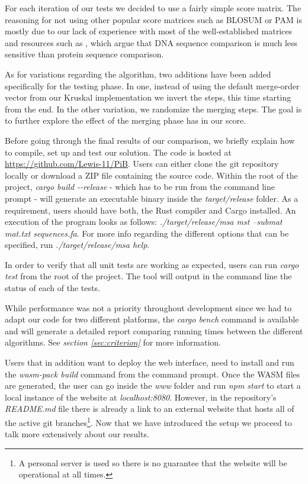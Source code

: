 \documentclass[twoside,openright,titlepage,numbers=noenddot,headinclude,%
                footinclude=true,cleardoublepage=empty,abstractoff, %
                BCOR=5mm,paper=a4,fontsize=11pt,%
                ngerman,american,%
                ]{scrreprt}
\begin{document}
For each iteration of our tests we decided to use a fairly simple score matrix. The reasoning for not using other popular score matrices such as BLOSUM or PAM is mostly due to our lack of experience with most of the well-established matrices and resources such as \cite{pearson2013selecting}, which argue that DNA sequence comparison is much less sensitive than protein sequence comparison.

As for variations regarding the algorithm, two additions have been added specifically for the testing phase. In one, instead of using the default merge-order vector from our Kruskal implementation we invert the steps, this time starting from the end. In the other variation, we randomize the merging steps. The goal is to further explore the effect of the merging phase has in our score.

Before going through the final results of our comparison, we briefly explain how to compile, set up and test our solution. The code is hosted at \url{https://github.com/Lewis-11/PiB}. Users can either clone the git repository locally or download a ZIP file containing the source code. Within the root of the project, \textit{cargo build -{}-release} - which has to be run from the command line prompt - will generate an executable binary inside the \textit{target/release} folder. As a requirement, users should have both, the Rust compiler and Cargo installed. An execution of the program looks as follows: \textit{./target/release/msa mst --submat mat.txt sequences.fa}. For more info regarding the different options that can be specified, run \textit{./target/release/msa help}.

In order to verify that all unit tests are working as expected, users can run \textit{cargo test} from the root of the project. The tool will output in the command line the status of each of the tests.

While performance was not a priority throughout development since we had to adapt our code for two different platforms, the \textit{cargo bench} command is available and will generate a detailed report comparing running times between the different algorithms. See \textit{section \ref{sec:criterion}} for more information.

Users that in addition want to deploy the web interface, need to install and run the \textit{wasm-pack build} command from the command prompt. Once the WASM files are generated, the user can go inside the \textit{www} folder and run \textit{npm start} to start a local instance of the website at \textit{localhost:8080}. However, in the repository's \textit{README.md} file there is already a link to an external website that hosts all of the active git branches\footnote{A personal server is used so there is no guarantee that the website will be operational at all times.}. Now that we have introduced the setup we proceed to talk more extensively about our results.
\end{document}
